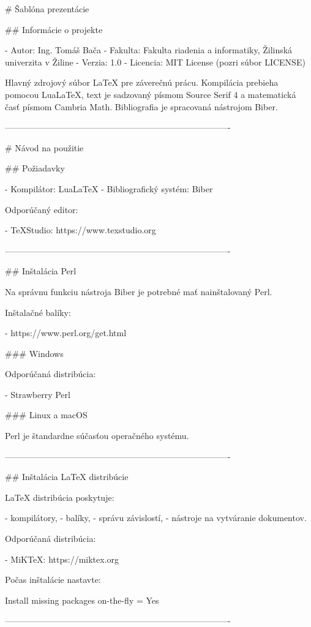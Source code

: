 \iffalse
# Šablóna prezentácie

## Informácie o projekte

- Autor: Ing. Tomáš Bača
- Fakulta: Fakulta riadenia a informatiky, Žilinská univerzita v Žiline
- Verzia: 1.0
- Licencia: MIT License (pozri súbor LICENSE)

Hlavný zdrojový súbor LaTeX pre záverečnú prácu. Kompilácia prebieha pomocou LuaLaTeX, text je sadzovaný písmom Source Serif 4 a matematická časť písmom Cambria Math. Bibliografia je spracovaná nástrojom Biber.

-------------------------------------------------------------------------------

# Návod na použitie

## Požiadavky

- Kompilátor: LuaLaTeX
- Bibliografický systém: Biber

Odporúčaný editor:

- TeXStudio: https://www.texstudio.org

-------------------------------------------------------------------------------

## Inštalácia Perl

Na správnu funkciu nástroja Biber je potrebné mať nainštalovaný Perl.

Inštalačné balíky:

- https://www.perl.org/get.html

### Windows

Odporúčaná distribúcia:

- Strawberry Perl

### Linux a macOS

Perl je štandardne súčasťou operačného systému.

-------------------------------------------------------------------------------

## Inštalácia LaTeX distribúcie

LaTeX distribúcia poskytuje:

- kompilátory,
- balíky,
- správu závislostí,
- nástroje na vytváranie dokumentov.

Odporúčaná distribúcia:

- MiKTeX: https://miktex.org

Počas inštalácie nastavte:

Install missing packages on-the-fly = Yes

-------------------------------------------------------------------------------

